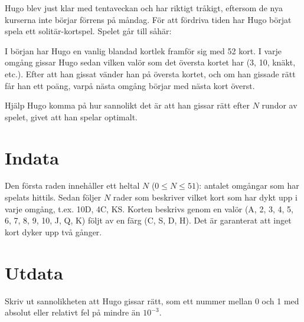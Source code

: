 Hugo blev just klar med tentaveckan och har riktigt tråkigt, eftersom de nya kurserna inte börjar förrens på måndag.
För att fördriva tiden har Hugo börjat spela ett solitär-kortspel. Spelet går till såhär:

I början har Hugo en vanlig blandad kortlek framför sig med 52 kort. I varje omgång gissar Hugo sedan vilken valör som det översta kortet har (3, 10, knäkt, etc.).
Efter att han gissat vänder han på översta kortet, och om han gissade rätt får han ett poäng, varpå nästa omgång börjar med nästa kort överst.

Hjälp Hugo komma på hur sannolikt det är att han gissar rätt efter $N$ rundor av spelet, givet att han spelar optimalt.

\section*{Indata}
Den första raden innehåller ett heltal $N$ ($0 \le N \le 51$): antalet omgångar som har spelats hittils.
Sedan följer $N$ rader som beskriver vilket kort som har dykt upp i varje omgång, t.ex. 10D, 4C, KS.
Korten beskrivs genom en valör (A, 2, 3, 4, 5, 6, 7, 8, 9, 10, J, Q, K) följt av en färg (C, S, D, H).
Det är garanterat att inget kort dyker upp två gånger.

\section*{Utdata}
Skriv ut sannolikheten att Hugo gissar rätt, som ett nummer mellan 0 och 1 med absolut eller relativt fel på mindre än $10^{-3}$.
